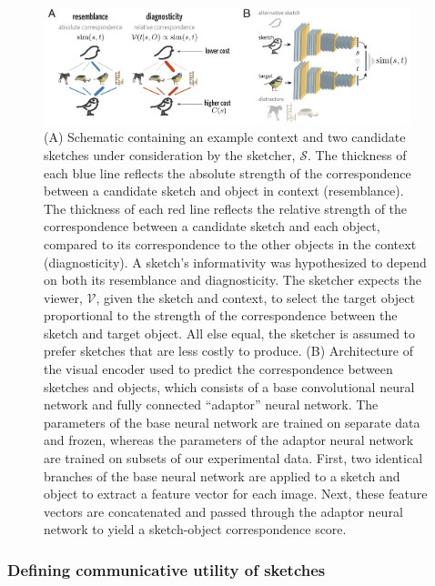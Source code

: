 \documentclass[9pt,twocolumn,twoside]{pnas-new}
\begin{document}
\begin{figure}[htbp]
\centering
\includegraphics[width=0.95\textwidth]{figures/4_model_schematic-min.pdf}
\caption{
(A) Schematic containing an example context and two candidate sketches under consideration by the sketcher, $\mathcal{S}$. 
The thickness of each blue line reflects the absolute strength of the correspondence between a candidate sketch and object in context (resemblance). 
The thickness of each red line reflects the relative strength of the correspondence between a candidate sketch and each object, compared to its correspondence to the other objects in the context (diagnosticity). 
A sketch's informativity was hypothesized to depend on both its resemblance and diagnosticity. 
The sketcher expects the viewer, $\mathcal{V}$, given the sketch and context, to select the target object proportional to the strength of the correspondence between the sketch and target object. 
All else equal, the sketcher is assumed to prefer sketches that are less costly to produce.
(B) Architecture of the visual encoder used to predict the correspondence between sketches and objects, which consists of a base convolutional neural network and fully connected ``adaptor'' neural network. 
The parameters of the base neural network are trained on separate data and frozen, whereas the parameters of the adaptor neural network are trained on subsets of our experimental data. 
First, two identical branches of the base neural network are applied to a sketch and object to extract a feature vector for each image. 
Next, these feature vectors are concatenated and passed through the adaptor neural network to yield a sketch-object correspondence score.}
\label{model_schematic}
\end{figure}

\subsubsection*{Defining communicative utility of sketches}
\end{document}

